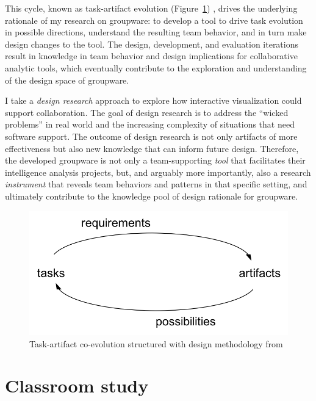 This cycle, known as task-artifact evolution (Figure~\ref{fig:task-artifact}) \citep{Carroll1992a}, drives the underlying rationale of my research on groupware: to develop a tool to drive task evolution in possible directions, understand the resulting team behavior, and in turn make design changes to the tool. The design, development, and evaluation iterations result in knowledge in team behavior and design implications for collaborative analytic tools, which eventually contribute to the exploration and understanding of the design space of groupware. 

I take a \emph{design research} approach \citep{Zimmerman2007a,Convertino2008e} to explore how interactive visualization could support collaboration. The goal of design research is to address the ``wicked problems'' \citep{Rittel1973} in real world and the increasing complexity of situations that need software support. The outcome of design research is not only artifacts of more effectiveness but also new knowledge that can inform future design. Therefore, the developed groupware is not only a team-supporting \emph{tool} that facilitates their intelligence analysis projects, but, and arguably more importantly, also a research \emph{instrument} that reveals team behaviors and patterns in that specific setting, and ultimately contribute to the knowledge pool of design rationale for groupware. 


\begin{figure}
	\centering
	\includegraphics[width=\columnwidth]{06-Discussion/img/task-artifact-1.png}
	\caption{Task-artifact co-evolution structured with design methodology from \cite{Carroll1992a} \label{fig:task-artifact}}
\end{figure}


\section{Classroom study}

